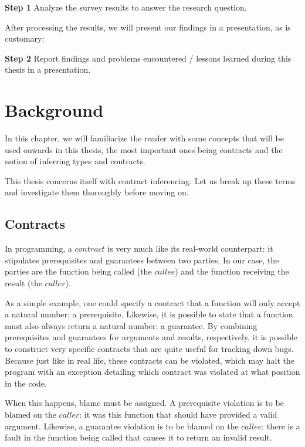 \documentclass[10pt]{report}
\begin{document}
\begin{description}
	\item{\textbf{Step 1}} Analyze the survey results to answer the research question.
\end{description}

After processing the results, we will present our findings in a presentation, as is customary:

\begin{description}
	\item{\textbf{Step 2}} Report findings and problems encountered / lessons learned during this thesis in a presentation.
\end{description}

\chapter{Background}
In this chapter, we will familiarize the reader with some concepts that will be used onwards in this thesis, the most important ones being contracts and the notion of inferring types and contracts.

This thesis concerns itself with contract inferencing.
Let us break up these terms and investigate them thoroughly before moving on.

\section{Contracts}
In programming, a $contract$ is very much like its real-world counterpart: it stipulates prerequisites and guarantees between two parties.
In our case, the parties are the function being called (the $callee$) and the function receiving the result (the $caller$).

As a simple example, one could specify a contract that a function will only accept a natural number: a prerequisite.
Likewise, it is possible to state that a function must also always return a natural number: a guarantee.
By combining prerequisites and guarantees for arguments and results, respectively, it is possible to construct very specific contracts that are quite useful for tracking down bugs.
Because just like in real life, these contracts can be violated, which may halt the program with an exception detailing which contract was violated at what position in the code.

When this happens, blame must be assigned.
A prerequisite violation is to be blamed on the $caller$: it was this function that should have provided a valid argument.
Likewise, a guarantee violation is to be blamed on the $callee$: there is a fault in the function being called that causes it to return an invalid result.
\end{document}

